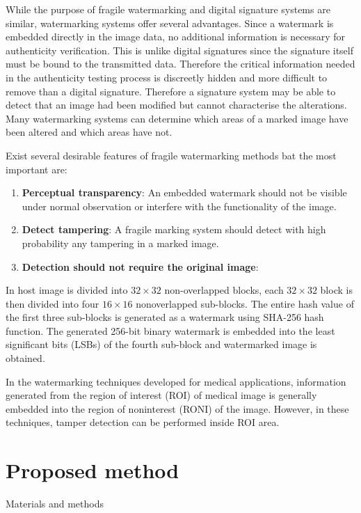 \documentclass[runningheads]{llncs}
\begin{document}
While the purpose of fragile watermarking and digital signature systems are similar, watermarking systems offer several advantages. Since a watermark is embedded directly in the image data, no additional information is necessary for authenticity verification. This is unlike digital signatures
since the signature itself must be bound to the transmitted data. Therefore the critical information needed in the authenticity testing process is discreetly hidden and more difficult to remove than a digital signature. Therefore a signature system may be able to detect that an image had been modified but cannot characterise the alterations. Many watermarking systems can determine which areas of a marked image have been altered and which areas have not.

Exist several desirable features of fragile watermarking methods bat the most important are:

\begin{enumerate}
	\item \textbf{Perceptual transparency}: An embedded watermark should not be visible under normal observation or interfere	with the functionality of the image.
	\item \textbf{Detect tampering}: A fragile marking system should detect with high probability any tampering in a marked image.
	\item \textbf{Detection should not require the original image}:
\end{enumerate}

In \cite{gul2019novel} host image is divided into $32\times 32$ non-overlapped blocks, each $32\times 32$ block is then divided into four $16\times 16$ nonoverlapped sub-blocks. The entire hash value of the first three sub-blocks is generated as a watermark using SHA-256 hash function. The generated 256-bit binary watermark is embedded into the least significant bits (LSBs) of the fourth sub-block and watermarked image is obtained.

In the watermarking techniques developed for medical applications, information generated from the region of interest (ROI) of medical image is generally embedded into the region of noninterest (RONI) of the image. However, in these
techniques, tamper detection can be performed inside ROI area.

\section{Proposed method}
Materials and methods
\end{document}
